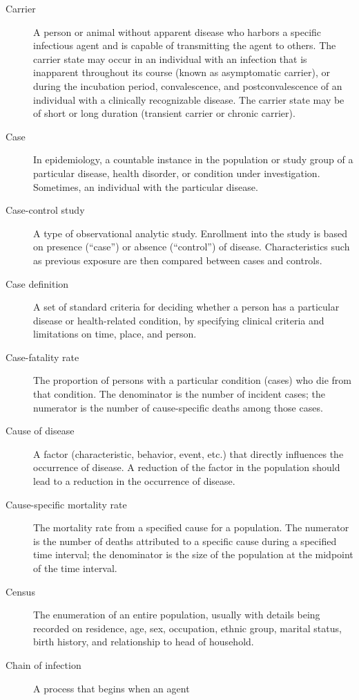 \documentclass[11pt]{article}
\begin{document}
\begin{description}
\item[Carrier] A person or animal without apparent disease who
harbors a specific infectious agent and is capable of
transmitting the agent to others. The carrier state may occur in
an individual with an infection that is inapparent throughout its
course (known as asymptomatic carrier), or during the incubation
period, convalescence, and postconvalescence of an individual
with a clinically recognizable disease. The carrier state may be
of short or long duration (transient carrier or chronic carrier).
\item[Case] In epidemiology, a countable instance in the
population or study group of a particular disease, health
disorder, or condition under investigation. Sometimes, an
individual with the particular disease.
\item[Case-control study] A type of observational analytic study.
Enrollment into the study is based on presence (``case'') or
absence (``control'') of disease. Characteristics such as
previous exposure are then compared between cases and controls.
\item[Case definition] A set of standard criteria for deciding
whether a person has a particular disease or health-related
condition, by specifying clinical criteria and limitations on
time, place, and person.
\item[Case-fatality rate] The proportion of persons with a
particular condition (cases) who die from that condition. The
denominator is the number of incident cases; the numerator is
the number of cause-specific deaths among those cases.
\item[Cause of disease] A factor (characteristic, behavior,
event, etc.) that directly influences the occurrence of disease.
A reduction of the factor in the population should lead to a
reduction in the occurrence of disease.
\item[Cause-specific mortality rate] The mortality rate from a
specified cause for a population. The numerator is the number of
deaths attributed to a specific cause during a specified time
interval; the denominator is the size of the population at the
midpoint of the time interval.
\item[Census] The enumeration of an entire population, usually
with details being recorded on residence, age, sex, occupation,
ethnic group, marital status, birth history, and relationship to
head of household.
\item[Chain of infection] A process that begins when an agent

\end{description}
\end{document}
